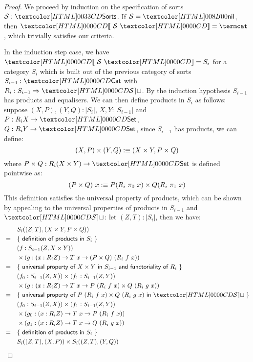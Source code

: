 \begin{proof}
  We proceed by induction on the specification of sorts
  $\Ss : \sortsty$.  If $\Ss = \sortsnil$, then $\SortCat{\Ss} = \termcat$,
  which trivially satisfies our criteria.

  In the induction step case, we have $\SortCat{\Ss} = S_i$ for a
  category $S_i$ which is built out of the previous category of sorts
  $S_{i-1} : \Cat$ with $R_i : \Func{S_{i-1}}{\SET}$. By the induction
  hypothesis $S_{i-1}$ has products and equalisers. We can then define
  products in $S_{i}$ as follows: suppose $(X,P), (Y,Q) : | S_{i} |$,
  \ie $X, Y : | S_{i-1} |$ and $P : R_i X \to \Set$,
  $Q : R_i Y \to \Set$, since $S_{i-1}$ has products, we can define:
  \[
    (X,P) \times (Y,Q) :\equiv (X \times Y , P \times Q)
  \]
  where $P \times Q : R_i (X \times Y) \to \Set$ is defined pointwise
  as:
  \[
    (P \times Q)\ x :\equiv P (R_i\ \pi_0\ x) \times Q (R_i\ \pi_1\ x)
  \]
  This definition satisfies the universal property of products, which
  can be shown by appealing to the universal properties of products in
  $S_{i-1}$ and $\SET$: let $(Z,T) : | S_{i} |$, then we have:
  \begin{align*}
    &&&S_i((Z,T),(X \times Y, P \times Q)) \\
    &=& &\reasontext{definition of products in $S_i$} \\
    &&& (f : S_{i-1}(Z,X \times Y)) \\
    &&& \times (g : (x : R_i Z) \to T\ x \to (P \times Q)\ (R_i\ f\ x)) \\
    &=& &\reasontext{universal property of $X \times Y$ in $S_{i-1}$ and functoriality of $R_i$} \\
    &&& (f_0 : S_{i-1}(Z,X)) \times (f_1 : S_{i-1}(Z,Y)) \\
    &&& \times (g : (x : R_iZ) \to T\ x \to P\ (R_i\ f\ x) \times Q\ (R_i\ g\ x)) \\
    &=& &\reasontext{universal property of $P\ (R_i\ f\ x) \times Q\ (R_i\ g\ x)$ in $\SET$} \\
    &&& (f_0 : S_{i-1}(Z,X)) \times (f_1 : S_{i-1}(Z,Y)) \\
    &&& \times (g_0 : (x : R_iZ) \to T\ x \to P\ (R_i\ f\ x)) \\
    &&& \times (g_1 : (x : R_iZ) \to T\ x \to Q\ (R_i\ g\ x)) \\
    &=& &\reasontext{definition of products in $S_i$} \\
    &&& S_i((Z,T),(X,P)) \times S_i((Z,T),(Y,Q))
  \end{align*}
\end{proof}

